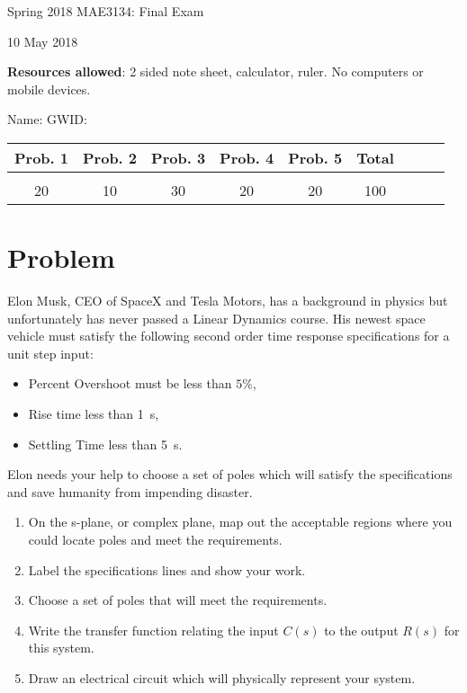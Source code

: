 \documentclass[titlepage, 11pt, reqno]{article}    %
\begin{document}
\begin{titlepage}
    \centering
    \vspace{1cm}
    {\Large Spring 2018 MAE3134: Final Exam\par }
    \vspace{3cm}
    {10 May 2018\par}
    \vspace{1cm}
    \textbf{Resources allowed}: 2 sided note sheet, calculator, ruler. 
    No computers or mobile devices.

    \vspace{1cm}
    {Name: \underline{\hspace{5cm}} \hspace{2cm} GWID:\underline{\hspace{5cm}}\par}
    \vspace{3cm}

    \begin{tabular}{|c|c|c|c|c|c|c|c|c|}
        \hline
        Prob. 1 & Prob. 2 & Prob. 3 & Prob. 4 & Prob. 5 & Total \\
        \hline
         & & & & &\\[4ex]
        \hline
        20 & 10 & 30 & 20 & 20 & 100 \\[4ex]
        \hline
    \end{tabular}
    \vfill
\end{titlepage}
\section{Problem}\label{prob:sys_response_to_poles}
Elon Musk, CEO of SpaceX and Tesla Motors, has a background in physics but unfortunately has never passed a Linear Dynamics course. 
His newest space vehicle must satisfy the following second order time response specifications for a unit step input:
\begin{itemize}
    \item Percent Overshoot must be less than \(5 \%\),
    \item Rise time less than \SI{1}{\second},
    \item Settling Time less than \SI{5}{\second}.
\end{itemize}
Elon needs your help to choose a set of poles which will satisfy the specifications and save humanity from impending disaster.
\begin{enumerate}
    \item On the s-plane, or complex plane, map out the acceptable regions where you could locate poles and meet the requirements. 
    \item Label the specifications lines and show your work.
    \item Choose a set of poles that will meet the requirements.
    \item Write the transfer function relating the input \( C(s) \) to the output \( R(s) \) for this system.
    \item Draw an electrical circuit which will physically represent your system.
\end{enumerate}
\end{document}
